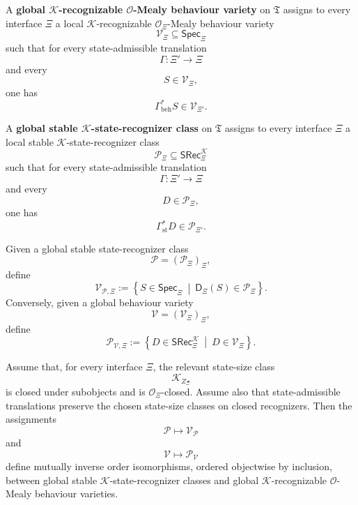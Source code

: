 \begin{definition}
\label{def:state-eilenberg-global-behaviour-variety}
A \textbf{global \(\mathcal K\)-recognizable \(\mathcal O\)-Mealy behaviour
variety} on \(\mathfrak T\) assigns to every interface \(\Xi\) a local
\(\mathcal K\)-recognizable \(\mathcal O_\Xi\)-Mealy behaviour variety
\[
\mathcal V_\Xi
\subseteq
\mathsf{Spec}_\Xi
\]
such that for every state-admissible translation
\[
\Gamma:\Xi'\to\Xi
\]
and every
\[
S\in\mathcal V_\Xi,
\]
one has
\[
\Gamma_{\mathrm{beh}}^\ast S\in\mathcal V_{\Xi'}.
\]
\end{definition}

\begin{definition}
\label{def:state-eilenberg-global-stable-state-recognizer-class}
A \textbf{global stable \(\mathcal K\)-state-recognizer class} on
\(\mathfrak T\) assigns to every interface \(\Xi\) a local stable
\(\mathcal K\)-state-recognizer class
\[
\mathcal P_\Xi
\subseteq
\mathsf{SRec}^{\mathcal K}_\Xi
\]
such that for every state-admissible translation
\[
\Gamma:\Xi'\to\Xi
\]
and every
\[
D\in\mathcal P_\Xi,
\]
one has
\[
\Gamma_{\mathrm{st}}^\ast D\in\mathcal P_{\Xi'}.
\]
\end{definition}

Given a global stable state-recognizer class
\[
\mathcal P=(\mathcal P_\Xi)_\Xi,
\]
define
\[
\mathcal V_{\mathcal P,\Xi}
:=
\left\{
S\in\mathsf{Spec}_\Xi
\ \middle|\
\mathsf D_\Xi(S)\in\mathcal P_\Xi
\right\}.
\]
Conversely, given a global behaviour variety
\[
\mathcal V=(\mathcal V_\Xi)_\Xi,
\]
define
\[
\mathcal P_{\mathcal V,\Xi}
:=
\left\{
D\in\mathsf{SRec}^{\mathcal K}_\Xi
\ \middle|\
D\in\mathcal V_\Xi
\right\}.
\]

\begin{theorem}
\label{thm:state-eilenberg-global-state-correspondence}
Assume that, for every interface \(\Xi\), the relevant state-size class
\[
\mathcal K_{Z_\Xi}
\]
is closed under subobjects and is \(\mathcal O_\Xi\)-closed. Assume also
that state-admissible translations preserve the chosen state-size classes on
closed recognizers. Then the assignments
\[
\mathcal P\longmapsto\mathcal V_{\mathcal P}
\]
and
\[
\mathcal V\longmapsto\mathcal P_{\mathcal V}
\]
define mutually inverse order isomorphisms, ordered objectwise by inclusion,
between global stable \(\mathcal K\)-state-recognizer classes and global
\(\mathcal K\)-recognizable \(\mathcal O\)-Mealy behaviour varieties.
\end{theorem}

